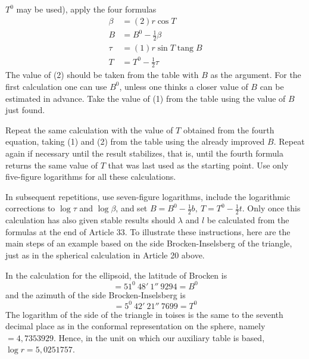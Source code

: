%
\(T^0\) may be used), apply the four formulas
\[
\begin{aligned}
\beta&=(2)r\cos T\\
B&=B^0-\tfrac12\beta\\
\tau&=(1)r\sin T\operatorname{tang}B\\
T&=T^0-\tfrac12\tau
\end{aligned}
\]
The value of (2) should be taken from the table with \(B\) as the argument. For the first calculation one can use \(B^0\), unless one thinks a closer value of \(B\) can be estimated in advance. Take the value of (1) from the table using the value of \(B\) just found.

Repeat the same calculation with the value of \(T\) obtained from the fourth equation, taking (1) and (2) from the table using the already improved \(B\). Repeat again if necessary until the result stabilizes, that is, until the fourth formula returns the same value of \(T\) that was last used as the starting point. Use only five-figure logarithms for all these calculations.

In subsequent repetitions, use seven-figure logarithms, include the logarithmic corrections to \(\log\tau\) and \(\log\beta\), and set \(B=B^0-\tfrac12b,\ T=T^0-\tfrac12t\). Only once this calculation has also given stable results should \(\lambda\) and \(l\) be calculated from the formulas at the end of Article 33. To illustrate these instructions, here are the main steps of an example based on the side Brocken-Inselsberg of the triangle, just as in the spherical calculation in Article 20 above.

In the calculation for the ellipsoid, the latitude of Brocken is
\[
=51^0\ 48'\ 1''\ 9294=B^0
\]
and the azimuth of the side Brocken-Inselsberg is
\[
=5^0\ 42'\ 21''\ 7699=T^0
\]
The logarithm of the side of the triangle in toises is the same to the seventh decimal place as in the conformal representation on the sphere, namely \(=4{,}7353929\). Hence, in the unit on which our auxiliary table is based, \(\log r=5{,}0251757\).
